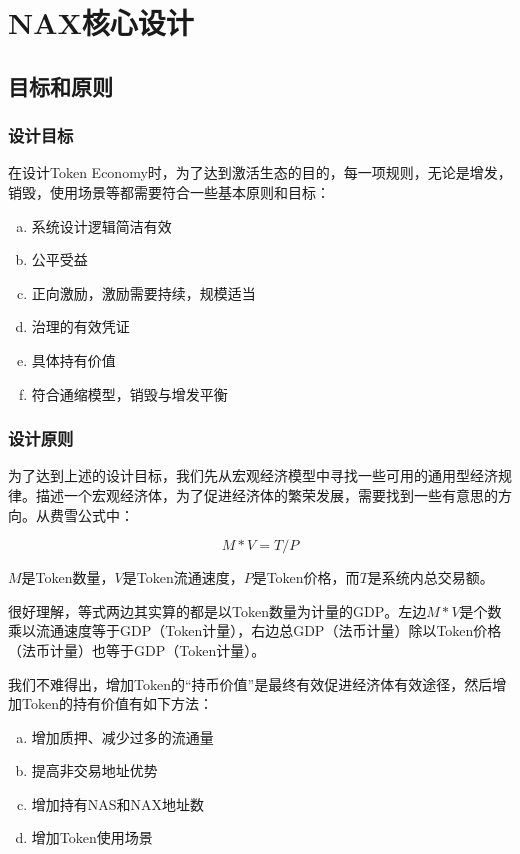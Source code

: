 \section{NAX核心设计}
\subsection{目标和原则}
\subsubsection{设计目标}
在设计Token Economy时，为了达到激活生态的目的，每一项规则，无论是增发，销毁，使用场景等都需要符合一些基本原则和目标：

\begin{enumerate}[a.]
	\item 系统设计逻辑简洁有效
	\item 公平受益
	\item 正向激励，激励需要持续，规模适当
        \item 治理的有效凭证
        \item 具体持有价值
        \item 符合通缩模型，销毁与增发平衡
\end{enumerate}

\subsubsection{设计原则}
为了达到上述的设计目标，我们先从宏观经济模型中寻找一些可用的通用型经济规律。描述一个宏观经济体，为了促进经济体的繁荣发展，需要找到一些有意思的方向。从费雪公式中：

\begin{equation}
M * V = T / P
\end{equation}

\(M\)是Token数量，\(V\)是Token流通速度，\(P\)是Token价格，而\(T\)是系统内总交易额。

很好理解，等式两边其实算的都是以Token数量为计量的GDP。左边\(M * V\)是个数乘以流通速度等于GDP（Token计量），右边总GDP（法币计量）除以Token价格（法币计量）也等于GDP（Token计量）。

我们不难得出，增加Token的“持币价值”是最终有效促进经济体有效途径，然后增加Token的持有价值有如下方法：

\begin{enumerate}[a.]
	\item 增加质押、减少过多的流通量
	\item 提高非交易地址优势
	\item 增加持有NAS和NAX地址数
	\item 增加Token使用场景
\end{enumerate}

